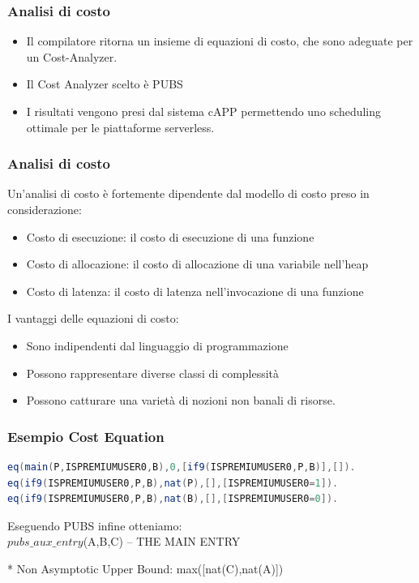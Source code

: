 \documentclass[xcolor=dvipsnames]{beamer}
\begin{document}
\begin{frame}
    \frametitle{Analisi di costo}
    \begin{itemize}
        \item Il compilatore ritorna un insieme di equazioni di costo, che sono adeguate per un Cost-Analyzer.
        \item Il Cost Analyzer scelto è PUBS
        \item I risultati vengono presi dal sistema cAPP permettendo uno scheduling ottimale per le piattaforme serverless.
    \end{itemize}
    
\end{frame}

\begin{frame}
    \frametitle{Analisi di costo}
    Un'analisi di costo è fortemente dipendente dal modello di costo preso in considerazione:
    \begin{itemize}
        \item \alert{Costo di esecuzione}: il costo di esecuzione di una funzione
        \item \alert{Costo di allocazione}: il costo di allocazione di una variabile nell'heap
        \item \alert{Costo di latenza}: il costo di latenza nell'invocazione di una funzione
    \end{itemize}
    I vantaggi delle equazioni di costo:
    \begin{itemize}
        \item Sono \alert{indipendenti} dal linguaggio di programmazione
        \item Possono rappresentare diverse classi di \alert{complessità}
        \item Possono catturare una varietà di nozioni non banali di risorse.
    \end{itemize}
\end{frame}
\begin{frame}[fragile]
    \frametitle{Esempio Cost Equation}
\begin{lstlisting}[language=Java, caption={Equazioni di costo per Listing 1}]
eq(main(P,ISPREMIUMUSER0,B),0,[if9(ISPREMIUMUSER0,P,B)],[]).
eq(if9(ISPREMIUMUSER0,P,B),nat(P),[],[ISPREMIUMUSER0=1]).
eq(if9(ISPREMIUMUSER0,P,B),nat(B),[],[ISPREMIUMUSER0=0]).
\end{lstlisting}
Eseguendo PUBS infine otteniamo:\\
\bigskip
$pubs\_aux\_entry$(A,B,C) -- THE MAIN ENTRY

  * Non Asymptotic Upper Bound: max([nat(C),nat(A)]) 
\end{frame}
\end{document}
